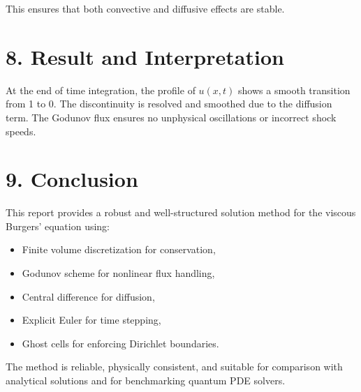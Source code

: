 \documentclass[12pt]{article}
\begin{document}
This ensures that both convective and diffusive effects are stable.

\section*{8. Result and Interpretation}
At the end of time integration, the profile of \( u(x,t) \) shows a smooth transition from 1 to 0. The discontinuity is resolved and smoothed due to the diffusion term. The Godunov flux ensures no unphysical oscillations or incorrect shock speeds.

\section*{9. Conclusion}
This report provides a robust and well-structured solution method for the viscous Burgers’ equation using:
\begin{itemize}
    \item Finite volume discretization for conservation,
    \item Godunov scheme for nonlinear flux handling,
    \item Central difference for diffusion,
    \item Explicit Euler for time stepping,
    \item Ghost cells for enforcing Dirichlet boundaries.
\end{itemize}
The method is reliable, physically consistent, and suitable for comparison with analytical solutions and for benchmarking quantum PDE solvers.
\end{document}
